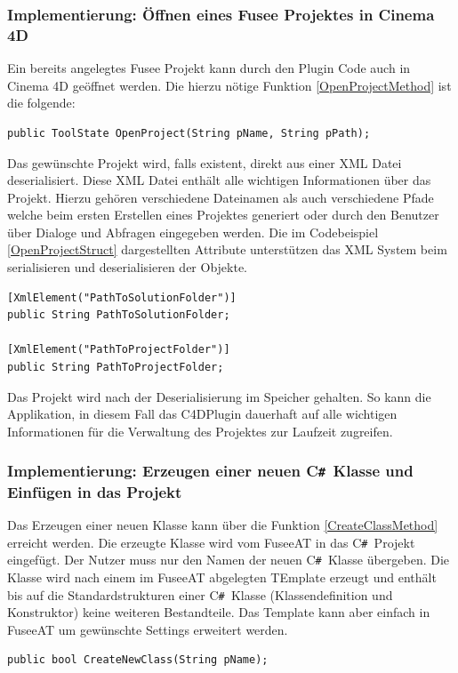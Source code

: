 \documentclass[pagesize, paper=a4, fontsize=12pt, titlepage=true, headings=small, headnosepline, abstractoff, liststotoc, nochapterprefix, plainheadsepline, twoside]{scrreprt}
\newcommand{\CSS}{C\texttt{\# }}
\begin{document}
\subsubsection{Implementierung: Öffnen eines Fusee Projektes in Cinema 4D}
Ein bereits angelegtes Fusee Projekt kann durch den Plugin Code auch in Cinema 4D geöffnet werden. Die hierzu nötige Funktion \ref{OpenProjectMethod} ist die folgende:
\begin{lstlisting}[label=OpenProjectMethod, caption=Funktion zum öffnen eines neuen Projekts in der Binary Version der Fusee Engine.]
	public ToolState OpenProject(String pName, String pPath);
\end{lstlisting}
Das gewünschte Projekt wird, falls existent, direkt aus einer XML Datei deserialisiert. Diese XML Datei enthält alle wichtigen Informationen über das Projekt. Hierzu gehören verschiedene Dateinamen als auch verschiedene Pfade welche beim ersten Erstellen eines Projektes generiert oder durch den Benutzer über Dialoge und Abfragen eingegeben werden. Die im Codebeispiel \ref{OpenProjectStruct} dargestellten Attribute unterstützen das XML System beim serialisieren und deserialisieren der Objekte.

\begin{lstlisting}[label=OpenProjectStruct, caption=Teil des Structs zum Serialisieren des Fusee Projektes aus Cinem a 4D. Die Serialisierung speichert das Projekt auf der Festplatte als lesbare XML Datei.]
[XmlElement("PathToSolutionFolder")]
public String PathToSolutionFolder;

[XmlElement("PathToProjectFolder")]
public String PathToProjectFolder;
\end{lstlisting}


Das Projekt wird nach der Deserialisierung im Speicher gehalten. So kann die Applikation, in diesem Fall das C4DPlugin dauerhaft auf alle wichtigen Informationen für die Verwaltung des Projektes zur Laufzeit zugreifen.

\subsubsection{Implementierung: Erzeugen einer neuen \CSS Klasse und Einfügen in das Projekt}
Das Erzeugen einer neuen Klasse kann über die Funktion \ref{CreateClassMethod} erreicht werden. Die erzeugte Klasse wird vom FuseeAT in das \CSS Projekt eingefügt. Der Nutzer muss nur den Namen der neuen \CSS Klasse übergeben. Die Klasse wird nach einem im FuseeAT abgelegten TEmplate erzeugt und enthält bis auf die Standardstrukturen einer \CSS Klasse (Klassendefinition und Konstruktor) keine weiteren Bestandteile. Das Template kann aber einfach in FuseeAT um gewünschte Settings erweitert werden.
\begin{lstlisting}[label=CreateClassMethod, caption=Funktion zum Erstellen einer neuen Klasse im \CSS Projekt.]
	public bool CreateNewClass(String pName);
\end{lstlisting}
\end{document}
